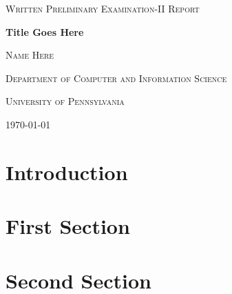 \documentclass[11pt]{article}
\begin{document}
\newcommand{\mainfile}{}
 
\begin{titlepage}

\centering
{\scshape\LARGE Written Preliminary Examination-II Report \par}
\vfill
{\huge\bfseries {\color{red} Title Goes Here} \par}
\vspace{2cm}
{\scshape\Large {\color{red} Name Here} \par}
\vspace{1cm}
{\scshape\Large Department of Computer and Information Science\par}
{\scshape\Large University of Pennsylvania\par}
\vfill
{\large \today \par}
\end{titlepage}




\pagebreak

\tableofcontents

\pagebreak

\section{Introduction}
\label{sec:introduction}


\pagebreak

\section{First Section}
\label{sec:firstsection}


\pagebreak

\section{Second Section}
\label{sec:secondsection}


\pagebreak



 
\end{document}
